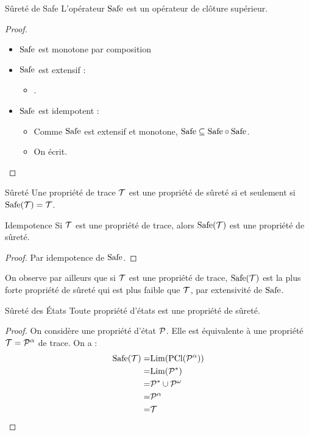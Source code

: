\documentclass{cours}
\begin{document}
\begin{propositionfr}{Sûreté de {\rm Safe}}{}
	L'opérateur $\rm Safe$ est un opérateur de clôture supérieur.
\end{propositionfr}
\begin{proof}
	\begin{itemize}
		\item ${\rm Safe}$ est monotone par composition
		\item $\rm Safe$ est extensif :
		      \begin{itemize}
			      \item .
		      \end{itemize}
		\item $\rm Safe$ est idempotent :
		      \begin{itemize}
			      \item Comme $\rm Safe$ est extensif et monotone, $\rm Safe \subseteq Safe \circ Safe$.
			      \item On écrit.
		      \end{itemize}
	\end{itemize}
\end{proof}
\begin{définition}{Sûreté}{}
Une propriété de trace $\mathcal{T}$ est une propriété de sûreté si et seulement si ${\rm Safe}(\mathcal{T}) = \mathcal{T}$.
\end{définition}
\begin{théorème}{Idempotence}{}
Si $\mathcal{T}$ est une propriété de trace, alors $\mathrm{Safe}(\mathcal{T})$ est une propriété de sûreté.
\end{théorème}
\begin{proof}
	Par idempotence de $\rm Safe$.
\end{proof}
On observe par ailleurs que si $\mathcal{T}$ est une propriété de trace, $\mathrm{Safe}(\mathcal{T})$ est la plus forte propriété de sûreté qui est plus faible que $\mathcal{T}$, par extensivité de $\rm Safe$.

\begin{théorème}{Sûreté des États}{}
Toute propriété d'états est une propriété de sûreté.
\end{théorème}
\begin{proof}
	On considère une propriété d'état $\mathcal{P}$. Elle est équivalente à une propriété $\mathcal{T} = \mathcal{P}^{\alpha}$ de trace. On a :
	\[
		\begin{aligned}
			\rm Safe(\mathcal{T}) = & \rm Lim(PCl(\mathcal{P}^{\alpha})) \\
			=               & \rm Lim (\mathcal{P}^{*})          \\
			=               & \mathcal{P}^{*} \cup \mathcal{P}^{\omega}  \\
			=               & \mathcal{P}^{\alpha}               \\
			=               & \mathcal{T}
		\end{aligned}
	\]
\end{proof}
\end{document}
